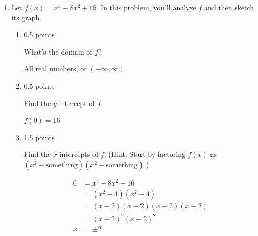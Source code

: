 \documentclass{article}
\begin{document}
\begin{enumerate}[resume]
\item \label{graph-(x^2-8x^2+16)}

  Let $f(x) = x^4 - 8x^2 + 16$. In this problem, you'll analyze $f$ and then sketch its graph. 

  \begin{enumerate}

  \item \label{graph-(x^2-8x^2+16)-domain}

    \begin{grading}
      0.5 points
    \end{grading}

    \begin{problem}[0.5in]
      What's the domain of $f$?  
    \end{problem}

    \begin{solution}
      All real numbers, or $(-\infty, \infty)$. 
    \end{solution}

  \item

    \begin{grading}
      0.5 points
    \end{grading}

    \begin{problem}[0.5in]
      Find the $y$-intercept of $f$.
    \end{problem}

    \begin{solution}
      $f(0) = 16$
    \end{solution}

  \item

    \begin{grading}
      1.5 points
    \end{grading}

    \begin{problem}[\stretch{0.75}]
      Find the $x$-intercepts of $f$. (Hint: Start by factoring $f(x)$ as $(x^2 - \text{something})(x^2 - \text{something})$.) 
    \end{problem}

    \begin{solution}
      \begin{align*}
        0 &= x^4-8x^2 + 16 \\
        &= (x^2 - 4)(x^2-4) \\
        &= (x+2)(x-2)(x+2)(x-2) \\
        &= (x+2)^2(x-2)^2 \\
        x &= \pm 2
      \end{align*}
    \end{solution}


\end{enumerate}
\end{enumerate}
\end{document}
